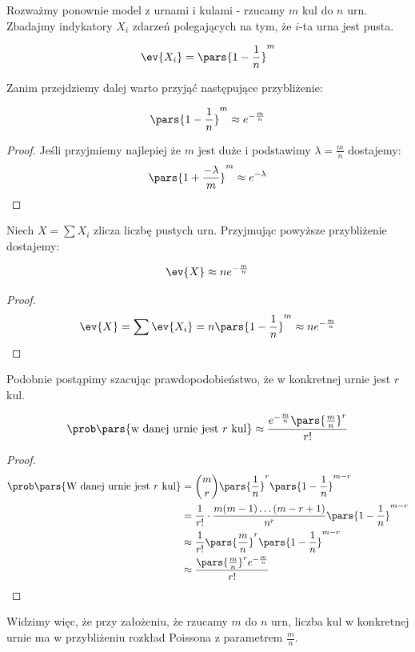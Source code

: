 Rozważmy ponownie model z urnami i kulami - rzucamy \(m\) kul do \(n\) urn.
Zbadajmy indykatory \(X_i\) zdarzeń polegających na tym, że \(i\)-ta urna jest pusta.

\begin{align*}
    \ev{X_i} = \pars{1 - \frac{1}{n}}^m
\end{align*}

Zanim przejdziemy dalej warto przyjąć następujące przybliżenie:

\begin{lemma}
    \begin{align*}
        \pars{1 - \frac{1}{n}}^m \approx e^{-\frac{m}{n}}
    \end{align*}
\end{lemma}
\begin{proof}
Jeśli przyjmiemy najlepiej że \(m\) jest duże i podstawimy \(\lambda = \frac{m}{n}\) dostajemy:
    \begin{align*}
        \pars{1 + \frac{-\lambda}{m}}^m \approx e^{-\lambda}
    \end{align*}
\end{proof}

Niech \(X = \sum X_i\) zlicza liczbę pustych urn. Przyjmując powyższe przybliżenie dostajemy:

\begin{theorem}
    \begin{align*}
        \ev{X} \approx ne^{-\frac{m}{n}}
    \end{align*}
\end{theorem}
\begin{proof}
    \begin{align*}
        \ev{X} = \sum \ev{X_i} = n\pars{1 - \frac{1}{n}}^m \approx ne^{-\frac{m}{n}}
    \end{align*}
\end{proof}

Podobnie postąpimy szacując prawdopodobieństwo, że w konkretnej urnie jest \(r\) kul.

\begin{theorem}
    \begin{align*}
        \prob\pars{\text{w danej urnie jest \(r\) kul}} \approx \frac{e^{-\frac{m}{n}}\pars{\frac{m}{n}}^r}{r!}
    \end{align*}
\end{theorem}
\begin{proof}
    \begin{align*}
        \prob\pars{\text{W danej urnie jest \(r\) kul}} &= \binom{m}{r}\pars{\frac{1}{n}}^r\pars{1 - \frac{1}{n}}^{m-r}\\
        &= \frac{1}{r!} \cdot \frac{m(m-1) \dots (m-r+1)}{n^r} \pars{1 - \frac{1}{n}}^{m-r}\\
        &\approx \frac{1}{r!}\pars{\frac{m}{n}}^r\pars{1 - \frac{1}{n}}^{m-r}\\
        &\approx \frac{\pars{\frac{m}{n}}^r e^{-\frac{m}{n}}}{r!}
    \end{align*}
\end{proof}

Widzimy więc, że przy założeniu, że rzucamy \(m\) do \(n\) urn, liczba kul w konkretnej urnie ma w przybliżeniu rozkład Poissona z parametrem \(\frac{m}{n}\).
